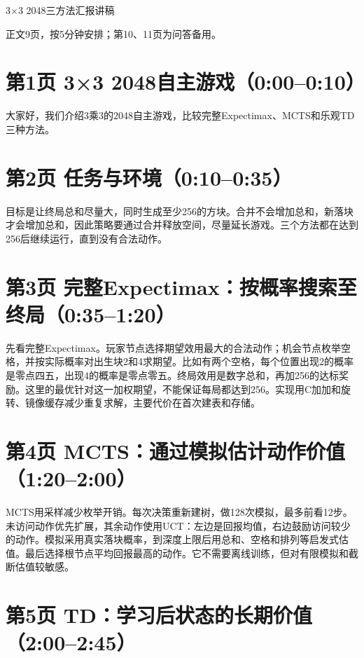 \documentclass[UTF8,zihao=-4,fontset=none]{ctexart}
\providecommand{\heiti}{\CJKfamily{zhhei}}
\begin{document}
\begin{center}\heiti\Large 3×3 2048三方法汇报讲稿\end{center}

\noindent 正文9页，按5分钟安排；第10、11页为问答备用。

\section*{第1页 3×3 2048自主游戏（0:00--0:10）}

大家好，我们介绍3乘3的2048自主游戏，比较完整Expectimax、MCTS和乐观TD三种方法。

\section*{第2页 任务与环境（0:10--0:35）}

目标是让终局总和尽量大，同时生成至少256的方块。合并不会增加总和，新落块才会增加总和，因此策略要通过合并释放空间，尽量延长游戏。三个方法都在达到256后继续运行，直到没有合法动作。

\section*{第3页 完整Expectimax：按概率搜索至终局（0:35--1:20）}

先看完整Expectimax。玩家节点选择期望效用最大的合法动作；机会节点枚举空格，并按实际概率对出生块2和4求期望。比如有两个空格，每个位置出现2的概率是零点四五，出现4的概率是零点零五。终局效用是数字总和，再加256的达标奖励。这里的最优针对这一加权期望，不能保证每局都达到256。实现用C加加和旋转、镜像缓存减少重复求解，主要代价在首次建表和存储。

\section*{第4页 MCTS：通过模拟估计动作价值（1:20--2:00）}

MCTS用采样减少枚举开销。每次决策重新建树，做128次模拟，最多前看12步。未访问动作优先扩展，其余动作使用UCT：左边是回报均值，右边鼓励访问较少的动作。模拟采用真实落块概率，到深度上限后用总和、空格和排列等启发式估值。最后选择根节点平均回报最高的动作。它不需要离线训练，但对有限模拟和截断估值较敏感。

\section*{第5页 TD：学习后状态的长期价值（2:00--2:45）}
\end{document}
